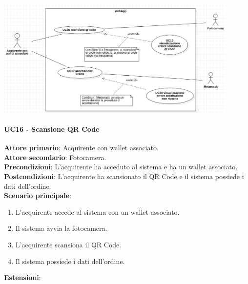 \documentclass[a4paper, 12pt]{article}
\begin{document}
\includegraphics[width=0.9\textwidth]{UseCase_webapp3}

\paragraph{UC16 - Scansione QR Code}
\textbf{Attore primario}: Acquirente con wallet associato.\\
\textbf{Attore secondario}: Fotocamera.\\
\textbf{Precondizioni}: L'acquirente ha acceduto al sistema e ha un wallet associato.\\
\textbf{Postcondizioni}: L'acquirente ha scansionato il QR Code e il sistema possiede i dati dell'ordine.\\
\textbf{Scenario principale}:
\begin{enumerate}
    \item L'acquirente accede al sistema con un wallet associato.
    \item Il sistema avvia la fotocamera.
    \item L'acquirente scansiona il QR Code.
    \item Il sistema possiede i dati dell'ordine.
\end{enumerate}
\textbf{Estensioni}:
\end{document}
